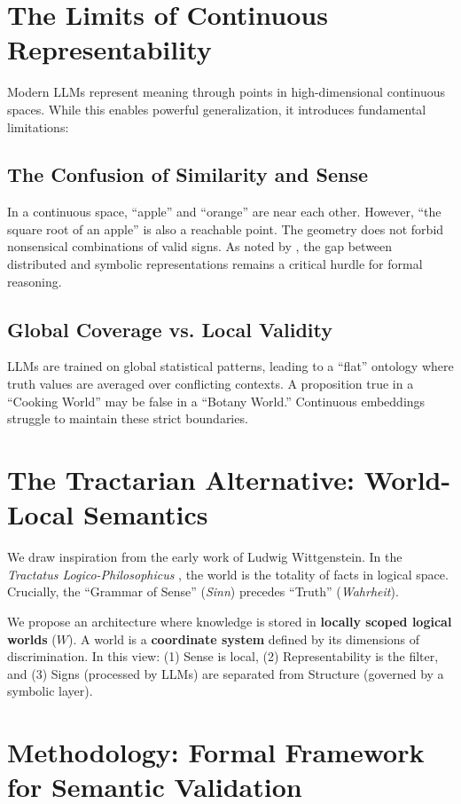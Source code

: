 \documentclass{article}
\begin{document}
\section{The Limits of Continuous Representability}

Modern LLMs represent meaning through points in high-dimensional continuous spaces. While this enables powerful generalization, it introduces fundamental limitations:

\subsection{The Confusion of Similarity and Sense}
In a continuous space, ``apple'' and ``orange'' are near each other. However, ``the square root of an apple'' is also a reachable point. The geometry does not forbid nonsensical combinations of valid signs. As noted by \citet{ferrone2019}, the gap between distributed and symbolic representations remains a critical hurdle for formal reasoning.

\subsection{Global Coverage vs. Local Validity}
LLMs are trained on global statistical patterns, leading to a ``flat'' ontology where truth values are averaged over conflicting contexts. A proposition true in a ``Cooking World'' may be false in a ``Botany World.'' Continuous embeddings struggle to maintain these strict boundaries.

\section{The Tractarian Alternative: World-Local Semantics}

We draw inspiration from the early work of Ludwig Wittgenstein. In the \textit{Tractatus Logico-Philosophicus} \citep{wittgenstein1922}, the world is the totality of facts in logical space. Crucially, the ``Grammar of Sense'' (\textit{Sinn}) precedes ``Truth'' (\textit{Wahrheit}).

We propose an architecture where knowledge is stored in \textbf{locally scoped logical worlds} ($W$). A world is a \textbf{coordinate system} defined by its dimensions of discrimination. In this view: (1) Sense is local, (2) Representability is the filter, and (3) Signs (processed by LLMs) are separated from Structure (governed by a symbolic layer).

\section{Methodology: Formal Framework for Semantic Validation}
\end{document}
